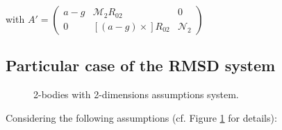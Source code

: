 \documentclass[\main/main.tex]{subfiles}
\begin{document}
with $A' = \begin{pmatrix}
  a - g & \mathcal{M}_2 R_{02} & 0\\
  0 & [(a - g) \times] R_{02} & \mathcal{N}_2
\end{pmatrix}$

\subsection{Particular case of the \ac{RMSD} system}

\begin{figure}[H]
\centering
   \caption{2-bodies with 2-dimensions assumptions system.}
   \label{fig:tikz:2_bodies}
\end{figure}

Considering the following assumptions (cf. Figure \ref{fig:tikz:2_bodies} for details):
\end{document}
